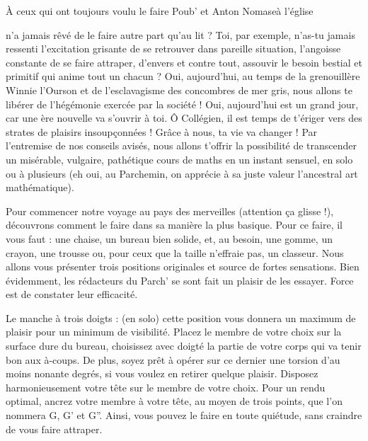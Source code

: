 \newpage




\vspace*{-1cm}
\begin{article*}
{À ceux qui ont toujours voulu le faire\saintValentin}
{Poub' et Anton Nomase}{à l'église}

\begin{spacing}{.98}
 n'a jamais rêvé de le faire autre part qu'au lit ? Toi, par exemple, n'as-tu jamais ressenti l'excitation grisante de se retrouver dans pareille situation, l'angoisse constante de se faire attraper, d'envers et contre tout, assouvir le besoin bestial et primitif qui anime tout un chacun ? Oui, aujourd'hui, au temps de la grenouillère Winnie l'Ourson et de l'esclavagisme des concombres de mer gris, nous allons te libérer de l'hégémonie exercée par la société ! Oui, aujourd'hui est un grand jour, car une ère nouvelle va s'ouvrir à toi. Ô Collégien, il est temps de t'ériger vers des strates de plaisirs insoupçonnées ! Grâce à nous, ta vie va changer !
Par l'entremise de nos conseils avisés, nous allons t'offrir la possibilité de transcender un misérable, vulgaire, pathétique cours de maths en un instant sensuel, en solo ou à plusieurs (eh oui, au Parchemin, on apprécie à sa juste valeur l'ancestral art mathématique).

Pour commencer notre voyage au pays des merveilles (attention ça glisse !), découvrons comment le faire dans sa manière la plus basique. Pour ce faire, il vous faut : une chaise, un bureau bien solide, et, au besoin, une gomme, un crayon, une trousse ou, pour ceux que la taille n'effraie pas, un classeur. Nous allons vous présenter trois positions originales et source de fortes sensations. Bien évidemment, les rédacteurs du Parch' se sont fait un plaisir de les essayer. Force est de constater leur efficacité.

Le manche à trois doigts : (en solo) cette position vous donnera un maximum de plaisir pour un minimum de visibilité. Placez le membre de votre choix sur la surface dure du bureau, choisissez avec doigté la partie de votre corps qui va tenir bon aux à-coups. De plus, soyez prêt à opérer sur ce dernier une torsion d'au moins nonante degrés, si vous voulez en retirer quelque plaisir. Disposez harmonieusement votre tête sur le membre de votre choix. Pour un rendu optimal, ancrez votre membre à votre tête, au moyen de trois points, que l'on nommera G, G' et G''. Ainsi, vous pouvez le faire en toute quiétude, sans craindre de vous faire attraper.


\end{spacing}
\end{article*}
